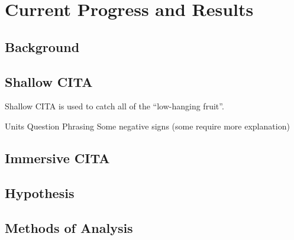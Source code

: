 \chapter[Chapter 6: Current Progress and Results]{Current Progress and Results}

\section{Background}

\section{Shallow CITA}

Shallow CITA is used to catch all of the ``low-hanging fruit''.

Units
Question Phrasing
Some negative signs (some require more explanation)

\section{Immersive CITA}

\section{Hypothesis}

\section{Methods of Analysis}

